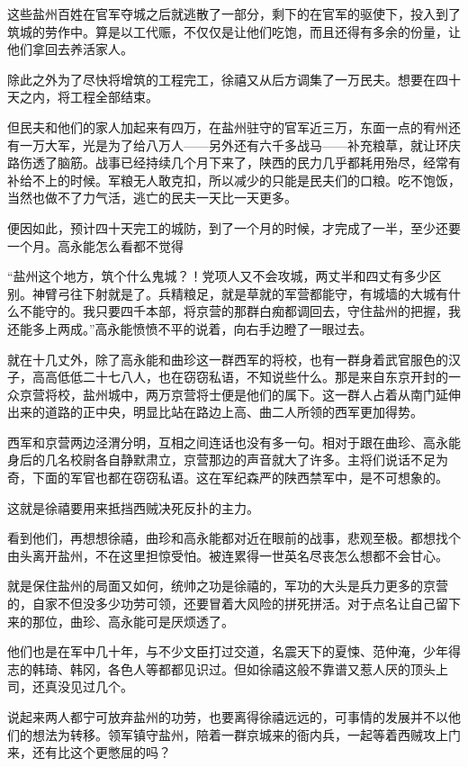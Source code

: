 这些盐州百姓在官军夺城之后就逃散了一部分，剩下的在官军的驱使下，投入到了筑城的劳作中。算是以工代赈，不仅仅是让他们吃饱，而且还得有多余的份量，让他们拿回去养活家人。

除此之外为了尽快将增筑的工程完工，徐禧又从后方调集了一万民夫。想要在四十天之内，将工程全部结束。

但民夫和他们的家人加起来有四万，在盐州驻守的官军近三万，东面一点的宥州还有一万大军，光是为了给八万人——另外还有六千多战马——补充粮草，就让环庆路伤透了脑筋。战事已经持续几个月下来了，陕西的民力几乎都耗用殆尽，经常有补给不上的时候。军粮无人敢克扣，所以减少的只能是民夫们的口粮。吃不饱饭，当然也做不了力气活，逃亡的民夫一天比一天更多。

便因如此，预计四十天完工的城防，到了一个月的时候，才完成了一半，至少还要一个月。高永能怎么看都不觉得

“盐州这个地方，筑个什么鬼城？！党项人又不会攻城，两丈半和四丈有多少区别。神臂弓往下射就是了。兵精粮足，就是草就的军营都能守，有城墙的大城有什么不能守的。我只要四千本部，将京营的那群白痴都调回去，守住盐州的把握，我还能多上两成。”高永能愤愤不平的说着，向右手边瞪了一眼过去。

就在十几丈外，除了高永能和曲珍这一群西军的将校，也有一群身着武官服色的汉子，高高低低二十七八人，也在窃窃私语，不知说些什么。那是来自东京开封的一众京营将校，盐州城中，两万京营将士便是他们的属下。这一群人占着从南门延伸出来的道路的正中央，明显比站在路边上高、曲二人所领的西军更加得势。

西军和京营两边泾渭分明，互相之间连话也没有多一句。相对于跟在曲珍、高永能身后的几名校尉各自静默肃立，京营那边的声音就大了许多。主将们说话不足为奇，下面的军官也都在窃窃私语。这在军纪森严的陕西禁军中，是不可想象的。

这就是徐禧要用来抵挡西贼决死反扑的主力。

看到他们，再想想徐禧，曲珍和高永能都对近在眼前的战事，悲观至极。都想找个由头离开盐州，不在这里担惊受怕。被连累得一世英名尽丧怎么想都不会甘心。

就是保住盐州的局面又如何，统帅之功是徐禧的，军功的大头是兵力更多的京营的，自家不但没多少功劳可领，还要冒着大风险的拼死拼活。对于点名让自己留下来的那位，曲珍、高永能可是厌烦透了。

他们也是在军中几十年，与不少文臣打过交道，名震天下的夏悚、范仲淹，少年得志的韩琦、韩冈，各色人等都都见识过。但如徐禧这般不靠谱又惹人厌的顶头上司，还真没见过几个。

说起来两人都宁可放弃盐州的功劳，也要离得徐禧远远的，可事情的发展并不以他们的想法为转移。领军镇守盐州，陪着一群京城来的衙内兵，一起等着西贼攻上门来，还有比这个更憋屈的吗？

